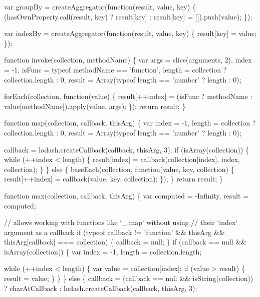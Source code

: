 \begin{DoxyCodeInclude}
    var groupBy = createAggregator(\textcolor{keyword}{function}(result, value, key) \{
      (hasOwnProperty.call(result, key) ? result[key] : result[key] = []).push(value);
    \});

    var indexBy = createAggregator(\textcolor{keyword}{function}(result, value, key) \{
      result[key] = value;
    \});

    \textcolor{keyword}{function} invoke(collection, methodName) \{
      var args = slice(arguments, 2),
          index = -1,
          isFunc = typeof methodName == \textcolor{stringliteral}{'function'},
          length = collection ? collection.length : 0,
          result = Array(typeof length == \textcolor{stringliteral}{'number'} ? length : 0);

      forEach(collection, \textcolor{keyword}{function}(value) \{
        result[++index] = (isFunc ? methodName : value[methodName]).apply(value, args);
      \});
      \textcolor{keywordflow}{return} result;
    \}

    \textcolor{keyword}{function} map(collection, callback, thisArg) \{
      var index = -1,
          length = collection ? collection.length : 0,
          result = Array(typeof length == \textcolor{stringliteral}{'number'} ? length : 0);

      callback = lodash.createCallback(callback, thisArg, 3);
      \textcolor{keywordflow}{if} (isArray(collection)) \{
        \textcolor{keywordflow}{while} (++index < length) \{
          result[index] = callback(collection[index], index, collection);
        \}
      \} \textcolor{keywordflow}{else} \{
        baseEach(collection, \textcolor{keyword}{function}(value, key, collection) \{
          result[++index] = callback(value, key, collection);
        \});
      \}
      \textcolor{keywordflow}{return} result;
    \}

    \textcolor{keyword}{function} max(collection, callback, thisArg) \{
      var computed = -Infinity,
          result = computed;

      \textcolor{comment}{// allows working with functions like `\_.map` without using}
      \textcolor{comment}{// their `index` argument as a callback}
      \textcolor{keywordflow}{if} (typeof callback != \textcolor{stringliteral}{'function'} && thisArg && thisArg[callback] === collection) \{
        callback = null;
      \}
      \textcolor{keywordflow}{if} (callback == null && isArray(collection)) \{
        var index = -1,
            length = collection.length;

        \textcolor{keywordflow}{while} (++index < length) \{
          var value = collection[index];
          \textcolor{keywordflow}{if} (value > result) \{
            result = value;
          \}
        \}
      \} \textcolor{keywordflow}{else} \{
        callback = (callback == null && isString(collection))
          ? charAtCallback
          : lodash.createCallback(callback, thisArg, 3);


\end{DoxyCodeInclude}

